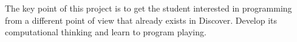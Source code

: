 The key point of this project is to get the student interested in programming from a different point of view that already exists in Discover. Develop its computational thinking and learn to program playing.








